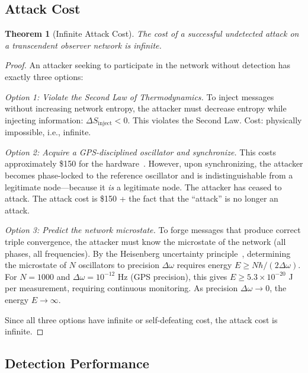 \documentclass[11pt,twocolumn,a4paper]{article}
\newtheorem{theorem}{Theorem}[section]
\theoremstyle{definition}
\begin{document}
\subsection{Attack Cost}\label{sec:security:cost}

\begin{theorem}[Infinite Attack Cost]\label{thm:infinite_cost}
The cost of a successful undetected attack on a transcendent observer network is infinite.
\end{theorem}

\begin{proof}
An attacker seeking to participate in the network without detection has exactly three
options:

\emph{Option 1: Violate the Second Law of Thermodynamics.}
To inject messages without increasing network entropy, the attacker must decrease entropy
while injecting information: $\Delta S_{\mathrm{inject}} < 0$. This violates the Second
Law. Cost: physically impossible, i.e., infinite.

\emph{Option 2: Acquire a GPS-disciplined oscillator and synchronize.}
This costs approximately \$150 for the hardware~\cite{sachikonye2024b}. However, upon
synchronizing, the attacker becomes phase-locked to the reference oscillator and is
indistinguishable from a legitimate node---because it \emph{is} a legitimate node. The
attacker has ceased to attack. The attack cost is \$150 + the fact that the ``attack''
is no longer an attack.

\emph{Option 3: Predict the network microstate.}
To forge messages that produce correct triple convergence, the attacker must know the
microstate of the network (all phases, all frequencies). By the Heisenberg uncertainty
principle~\cite{heisenberg1927}, determining the microstate of $N$ oscillators to
precision $\Delta\omega$ requires energy $E \geq N\hbar/(2\Delta\omega)$. For
$N = 1000$ and $\Delta\omega = 10^{-12}$ Hz (GPS precision), this gives
$E \geq 5.3 \times 10^{-20}$ J per measurement, requiring continuous monitoring.
As precision $\Delta\omega \to 0$, the energy $E \to \infty$.

Since all three options have infinite or self-defeating cost, the attack cost is infinite.
\end{proof}

\subsection{Detection Performance}\label{sec:security:performance}
\end{document}
